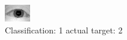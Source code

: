 \begin{figure}[h!]
\begin{center}
\includegraphics[width=0.60\columnwidth]{figures/ID949_class_1_target_2.png}
\end{center}
\caption{ Classification: 1 actual target: 2}
\label{fig:ID949_class_1_target_2}
\end{figure}
